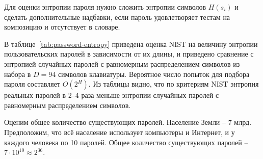 Для оценки энтропии пароля нужно сложить энтропии символов $H(s_i)$ и сделать дополнительные надбавки, если пароль удовлетворяет тестам на композицию и отсутствует в словаре.

\begin{table}[!ht]
    \caption{Оценка NIST предполагаемой энтропии паролей\label{tab:password-entropy}}
\end{table}

В таблице~\ref{tab:password-entropy} приведена оценка NIST на величину энтропии пользовательских паролей в зависимости от их длины, и приведено сравнение с энтропией случайных паролей с равномерным распределением символов из набора в $D=94$ символов клавиатуры. Вероятное число попыток для подбора пароля составляет $O(2^H)$. Из таблицы видно, что по критериям NIST энтропия реальных паролей в 2--4 раза меньше энтропии случайных паролей с равномерным распределением символов.

\example
Оценим общее количество существующих паролей. Население Земли -- 7 млрд. Предположим, что всё население использует компьютеры и Интернет, и у каждого человека по 10 паролей. Общее количество существующих паролей -- $7 \cdot 10^{10} \approx 2^{36}$.


